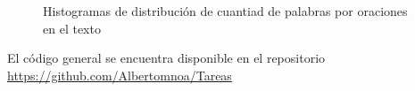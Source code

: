 \documentclass{article}
\begin{document}
\begin{figure}
\centering
{}
\label{fig:a}
\centering
{}
\label{fig:b}
\vspace{-0.2cm}
\caption{Histogramas de distribución de cuantiad de palabras por oraciones en el texto}
\label{fig:3} 
\end{figure}

El código general se encuentra disponible en el repositorio \href{https://github.com/Albertomnoa/Tareas_MPA/tree/master/Tarea3}{https://github.com/Albertomnoa/Tareas} 

\newpage


\end{document}
